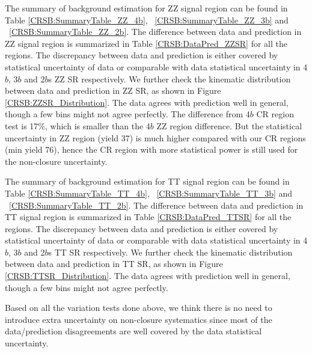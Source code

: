 The summary of background estimation for ZZ signal region can be found in Table \ref{CRSB:SummaryTable_ZZ_4b}, ~\ref{CRSB:SummaryTable_ZZ_3b} and ~\ref{CRSB:SummaryTable_ZZ_2b}. The difference between data and prediction in ZZ signal region is summarized in Table \ref{CRSB:DataPred_ZZSR} for all the regions. The discrepancy between data and prediction is either covered by statistical uncertainty of data or comparable with data statistical uncertainty in 4$b$, 3$b$ and 2$b$s ZZ SR respectively. We further check the kinematic distribution between data and prediction in ZZ SR, as shown in Figure \ref{CRSB:ZZSR_Distribution}. The data agrees with prediction well in general, though a few bins might not agree perfectly. The difference from 4$b$ CR region test is 17$\%$, which is smaller than the 4$b$ ZZ region difference. But the statistical uncertainty in ZZ region (yield 37) is much higher compared with our CR regions (min yield 76), hence the CR region with more statistical power is still used for the non-closure uncertainty.

The summary of background estimation for TT signal region can be found in Table \ref{CRSB:SummaryTable_TT_4b}, ~\ref{CRSB:SummaryTable_TT_3b} and ~\ref{CRSB:SummaryTable_TT_2b}. The difference between data and prediction in TT signal region is summarized in Table \ref{CRSB:DataPred_TTSR} for all the regions. The discrepancy between data and prediction is either covered by statistical uncertainty of data or comparable with data statistical uncertainty in 4$b$, 3$b$ and 2$b$s TT SR respectively. We further check the kinematic distribution between data and prediction in TT SR, as shown in Figure \ref{CRSB:TTSR_Distribution}. The data agrees with prediction well in general, though a few bins might not agree perfectly. 

Based on all the variation tests done above, we think there is no need to introduce extra uncertainty on non-closure systematics since most of the data/prediction disagreements are well covered by the data statistical uncertainty.

